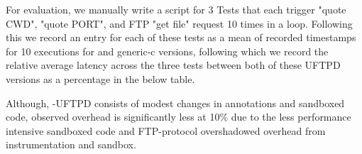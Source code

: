For evaluation, we manually write a script for 3 Tests that each trigger "quote CWD", "quote PORT", and FTP "get file" request 10 times in a loop. Following this we record an entry for each of these tests as a mean of recorded timestamps for 10 executions for \systemname and generic-c versions, following which we record the relative average latency across the three tests between both of these UFTPD versions as a percentage in the below table.   

Although, \systemname-UFTPD consists of modest changes in annotations and sandboxed code, observed overhead is significantly less at 10\% due to the less performance intensive sandboxed code and FTP-protocol overshadowed overhead from \systemname instrumentation and sandbox.     


% 






